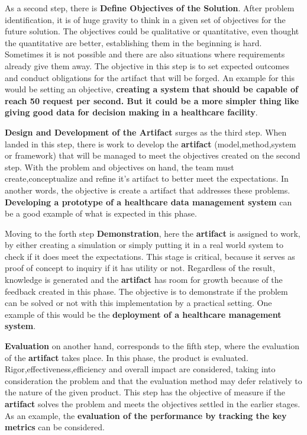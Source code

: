 As a second step, there is \textbf{Define Objectives of the Solution}. After problem identification, it is of huge gravity to think 
in a given set of objectives for the future solution. The objectives could be qualitative or quantitative, even thought the quantitative
are better, establishing them in the beginning is hard. Sometimes it is not possible and there are also situations where requirements 
already give them away. The objective in this step is to set expected outcomes and conduct obligations for the artifact that will be 
forged. An example for this would be setting an objective, \textbf{creating a system that should be capable of reach 50 request per second. 
But it could be a more simpler thing like giving good data for decision making in a healthcare facility}.

\textbf{Design and Development of the Artifact} surges as the third step. When landed in this step, there is work to develop 
the \textbf{artifact} (model,method,system or framework) that will be managed to meet the objectives created on the second step. With 
the problem and objectives on hand, the team must create,conceptualize and refine it's artifact to better meet the expectations. In another 
words, the objective is create a artifact that addresses these problems. \textbf{Developing a prototype of a healthcare data management 
system} can be a good example of what is expected in this phase.

Moving to the forth step \textbf{Demonstration}, here the \textbf{artifact} is assigned to work, by either creating a simulation or 
simply putting it in a real world system to check if it does meet the expectations. This stage is critical, because it serves as 
proof of concept to inquiry if it has utility or not. Regardless of the result, knowledge is generated and the \textbf{artifact} has 
room for growth because of the feedback created in this phase. The objective is to demonstrate if the problem can be solved or not with this 
implementation by a practical setting. One example of this would be the \textbf{deployment of a healthcare management system}.

\textbf{Evaluation} on another hand, corresponds to the fifth step, where the evaluation of the \textbf{artifact} takes place. In this phase,
the product is evaluated. Rigor,effectiveness,efficiency and overall impact are considered, taking into consideration the problem and that 
the evaluation method may defer relatively to the nature of the given product. This step has the objective of measure if the 
\textbf{artifact} solves the problem and meets the objectives settled in the earlier stages. As an example, the 
\textbf{evaluation of the performance by tracking the key metrics} can be considered.

